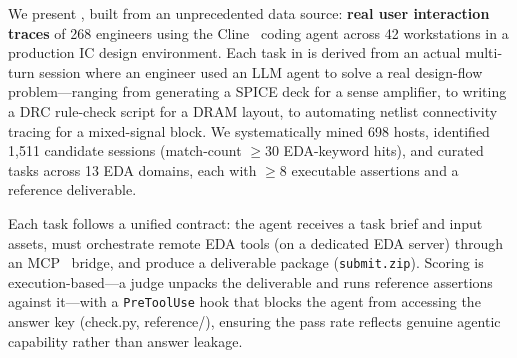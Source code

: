 We present \bench, built from an unprecedented data source: \textbf{real user interaction traces} of 268 engineers using the Cline~\cite{cline2026} coding agent across 42 workstations in a production IC design environment. Each task in \bench{} is derived from an actual multi-turn session where an engineer used an LLM agent to solve a real design-flow problem---ranging from generating a SPICE deck for a sense amplifier, to writing a DRC rule-check script for a DRAM layout, to automating netlist connectivity tracing for a mixed-signal block. We systematically mined 698 hosts, identified 1{,}511 candidate sessions (match-count $\geq 30$ EDA-keyword hits), and curated \Ntasks{} tasks across 13 EDA domains, each with $\geq 8$ executable assertions and a reference deliverable.

Each task follows a unified \mode{} contract: the agent receives a task brief and input assets, must orchestrate remote EDA tools (on a dedicated EDA server) through an MCP~\cite{lee2025autoeda} bridge, and produce a deliverable package (\texttt{submit.zip}). Scoring is execution-based---a judge unpacks the deliverable and runs reference assertions against it---with a \texttt{PreToolUse} hook that blocks the agent from accessing the answer key (check.py, reference/), ensuring the pass rate reflects genuine agentic capability rather than answer leakage.

